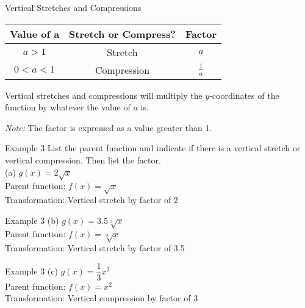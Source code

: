 \documentclass[t]{beamer}
\begin{document}
\begin{frame}{Vertical Stretches and Compressions}
\begin{center}
\setlength{\extrarowheight}{6pt}
\begin{tabular}{c|c|c}
\textbf{Value of $\bm{a}$} & \textbf{Stretch or Compress?} & \textbf{Factor} \\ \hline
$a > 1$ & Stretch & $a$ \\[6pt] \hline
$0 < a < 1$ & Compression & $\frac{1}{a}$ \\
\end{tabular}
\end{center}
\pause \vspace{11pt}
Vertical stretches and compressions will multiply the $y$-coordinates  of the function by whatever the value of $a$ is.	\newline\\	\pause

\alert{\emph{Note:}} The factor is expressed as a value greater than 1.
\end{frame}

\begin{frame}{Example 3}
List the parent function and indicate if there is a vertical stretch or vertical compression. Then list the factor.	\newline\\
(a) \quad $g(x) = 2\sqrt{x}$	\newline\\	\pause
Parent function: $f(x) = \sqrt{x}$ \newline\\	\pause
Transformation: Vertical stretch by factor of 2
\end{frame}

\begin{frame}{Example 3}
(b) \quad $g(x) = 3.5\sqrt[3]{x}$	\newline\\	\pause
Parent function: $f(x) = \sqrt[3]{x}$ \newline\\	\pause
Transformation: Vertical stretch by factor of 3.5
\end{frame}

\begin{frame}{Example 3}
(c) \quad $g(x) = \dfrac{1}{3}x^2$	\newline\\	\pause
Parent function: $f(x) = x^2$ \newline\\	\pause
Transformation: Vertical compression by factor of 3
\end{frame}
\end{document}
